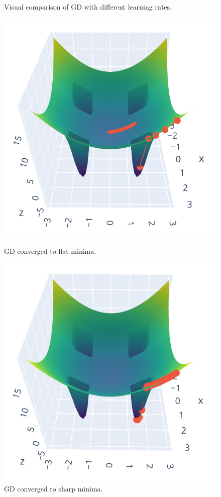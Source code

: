 \documentclass{article}
\theoremstyle{definition}
\begin{document}
\begin{figure}[h]
    \caption{Visual comparison of GD with different learning rates.}
      \includegraphics[width=\linewidth]{2d_example_flat.png}
      \caption{GD converged to flat minima.}
    \endminipage\hfill
      \includegraphics[width=\linewidth]{2d_example_sharp.png}
      \caption{GD converged to sharp minima.}
    \endminipage
\end{figure}
\end{document}
